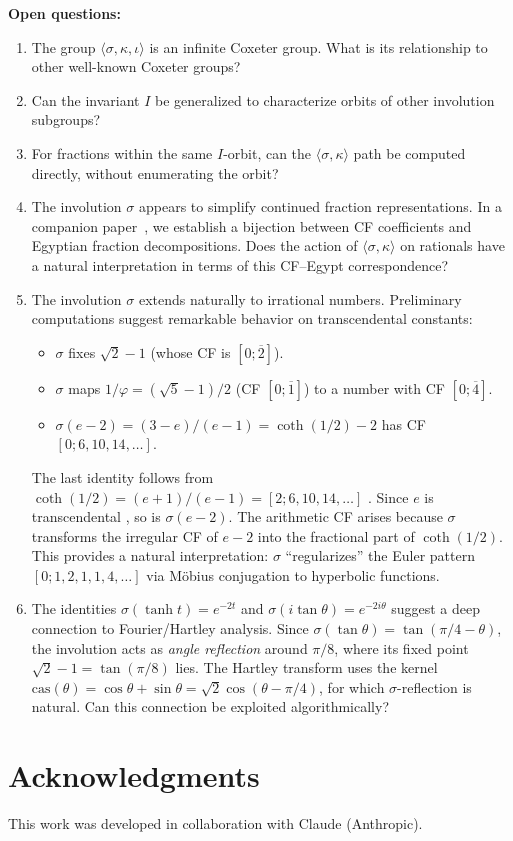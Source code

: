 \documentclass[11pt]{article}
\theoremstyle{plain}
\theoremstyle{definition}
\theoremstyle{remark}
\begin{document}
\textbf{Open questions:}
\begin{enumerate}[label=(\arabic*)]
\item The group $\langle \sigma, \kappa, \iota \rangle$ is an infinite
Coxeter group. What is its relationship to other well-known Coxeter groups?
\item Can the invariant $I$ be generalized to characterize orbits of other
involution subgroups?
\item For fractions within the same $I$-orbit, can the $\langle \sigma, \kappa \rangle$
path be computed directly, without enumerating the orbit?
\item The involution $\sigma$ appears to simplify continued fraction representations.
In a companion paper~\cite{PopelkaEgypt2025}, we establish a bijection between
CF coefficients and Egyptian fraction decompositions. Does the action of
$\langle \sigma, \kappa \rangle$ on rationals have a natural interpretation
in terms of this CF--Egypt correspondence?
\item The involution $\sigma$ extends naturally to irrational numbers.
Preliminary computations suggest remarkable behavior on transcendental constants:
\begin{itemize}
\item $\sigma$ fixes $\sqrt{2}-1$ (whose CF is $[0; \overline{2}]$).
\item $\sigma$ maps $1/\varphi = (\sqrt{5}-1)/2$ (CF $[0; \overline{1}]$)
      to a number with CF $[0; \overline{4}]$.
\item $\sigma(e-2) = (3-e)/(e-1) = \coth(1/2) - 2$ has CF $[0; 6, 10, 14, \ldots]$.
\end{itemize}
The last identity follows from $\coth(1/2) = (e+1)/(e-1) = [2; 6, 10, 14, \ldots]$
\cite{OEIS-A016825}. Since $e$ is transcendental \cite{Hermite1873},
so is $\sigma(e-2)$. The arithmetic CF arises because
$\sigma$ transforms the irregular CF of $e-2$ into the fractional part of $\coth(1/2)$.
This provides a natural interpretation: $\sigma$ ``regularizes'' the Euler pattern
$[0; 1, 2, 1, 1, 4, \ldots]$ via M\"obius conjugation to hyperbolic functions.
\item The identities $\sigma(\tanh t) = e^{-2t}$ and $\sigma(i\tan\theta) = e^{-2i\theta}$
suggest a deep connection to Fourier/Hartley analysis. Since $\sigma(\tan\theta) = \tan(\pi/4 - \theta)$,
the involution acts as \emph{angle reflection} around $\pi/8$, where its fixed point
$\sqrt{2}-1 = \tan(\pi/8)$ lies. The Hartley transform uses the kernel
$\mathrm{cas}(\theta) = \cos\theta + \sin\theta = \sqrt{2}\cos(\theta - \pi/4)$,
for which $\sigma$-reflection is natural. Can this connection be exploited algorithmically?
\end{enumerate}

\section*{Acknowledgments}

This work was developed in collaboration with Claude (Anthropic).



\end{document}
